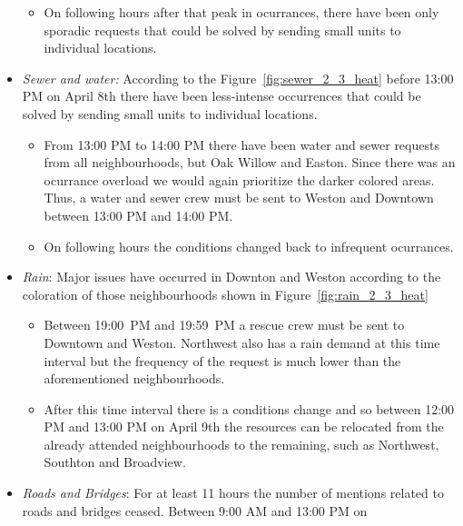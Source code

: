 \begin{itemize}
\begin{itemize}
\item On following hours after that peak in ocurrances, there have been only sporadic
requests that could be solved by sending small units to individual locations.
 \end{itemize} 
\item \emph{Sewer and water:} According to the Figure~\ref{fig:sewer_2_3_heat}
before 13:00 PM on April 8th there have been less-intense occurrences that could be solved
by sending small units to individual locations. 
 \begin{itemize}                                                                  
 \item From 13:00 PM to 14:00 PM there have been water and sewer requests from
all neighbourhoods, but Oak Willow and Easton. 
Since there was an ocurrance overload we would again prioritize the darker colored
areas. Thus, a water and sewer crew must be sent to Weston and Downtown between 13:00
PM and 14:00 PM. 
\item On following hours the conditions changed back to infrequent ocurrances.
\end{itemize}                                                           
     \smallskip                                                                   
     \item \emph{Rain}: Major issues have occurred in Downton and Weston
according to the coloration of those neighbourhoods shown in Figure~\ref{fig:rain_2_3_heat}                             
     \begin{itemize}                                                              
         \item Between 19:00~PM and 19:59~PM a rescue crew must be sent to
Downtown and Weston. Northwest also has a rain demand at this time interval but the 
 frequency of the request is much lower than the aforementioned neighbourhoods.                                                             
         \item After this time interval there is a conditions change and so between
12:00 PM and 13:00 PM on April 9th the resources can be relocated from the already attended neighbourhoods to the
remaining, such as Northwest, Southton and Broadview.          
     \end{itemize}                                                                
     \item \emph{Roads and Bridges}: For at least 11 hours the number of
mentions related to roads and bridges ceased. Between 9:00 AM and 13:00 PM on

\end{itemize}
